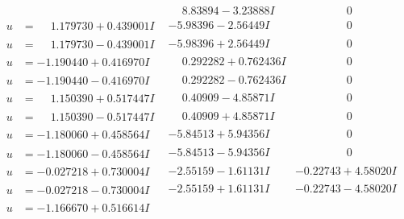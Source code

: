 \documentclass[1p]{elsarticle_modified}
\theoremstyle{definition}
\begin{document}
$$\begin{array}{c|c|c}
 & \phantom{-}8.83894 - 3.23888 I & \phantom{-0.000000 } 0 \\ \hline\begin{aligned}
u &= \phantom{-}1.179730 + 0.439001 I\end{aligned}
 & -5.98396 - 2.56449 I & \phantom{-0.000000 } 0 \\ \hline\begin{aligned}
u &= \phantom{-}1.179730 - 0.439001 I\end{aligned}
 & -5.98396 + 2.56449 I & \phantom{-0.000000 } 0 \\ \hline\begin{aligned}
u &= -1.190440 + 0.416970 I\end{aligned}
 & \phantom{-}0.292282 + 0.762436 I & \phantom{-0.000000 } 0 \\ \hline\begin{aligned}
u &= -1.190440 - 0.416970 I\end{aligned}
 & \phantom{-}0.292282 - 0.762436 I & \phantom{-0.000000 } 0 \\ \hline\begin{aligned}
u &= \phantom{-}1.150390 + 0.517447 I\end{aligned}
 & \phantom{-}0.40909 - 4.85871 I & \phantom{-0.000000 } 0 \\ \hline\begin{aligned}
u &= \phantom{-}1.150390 - 0.517447 I\end{aligned}
 & \phantom{-}0.40909 + 4.85871 I & \phantom{-0.000000 } 0 \\ \hline\begin{aligned}
u &= -1.180060 + 0.458564 I\end{aligned}
 & -5.84513 + 5.94356 I & \phantom{-0.000000 } 0 \\ \hline\begin{aligned}
u &= -1.180060 - 0.458564 I\end{aligned}
 & -5.84513 - 5.94356 I & \phantom{-0.000000 } 0 \\ \hline\begin{aligned}
u &= -0.027218 + 0.730004 I\end{aligned}
 & -2.55159 - 1.61131 I & -0.22743 + 4.58020 I \\ \hline\begin{aligned}
u &= -0.027218 - 0.730004 I\end{aligned}
 & -2.55159 + 1.61131 I & -0.22743 - 4.58020 I \\ \hline\begin{aligned}
u &= -1.166670 + 0.516614 I\end{aligned}

\end{array}$$
\end{document}
